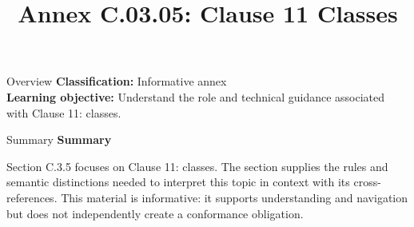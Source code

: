 \documentclass[10pt,letterpaper]{article}
\title{Annex C.03.05: Clause 11 Classes}
\author{}
\date{}
\begin{document}
\maketitle
\begin{CornellOverviewBox}{Overview}
\textbf{Classification:} Informative annex\\[2pt]
\textbf{Learning objective:} Understand the role and technical guidance associated with Clause 11: classes.
\end{CornellOverviewBox}\begin{CornellSummaryBox}{Summary}
{\sffamily\bfseries\color{Accent} Summary}\par\vspace{3pt}Section C.3.5 focuses on Clause 11: classes. The section supplies the rules and semantic distinctions needed to interpret this topic in context with its cross-references. This material is informative: it supports understanding and navigation but does not independently create a conformance obligation.
\end{CornellSummaryBox}
\end{document}
